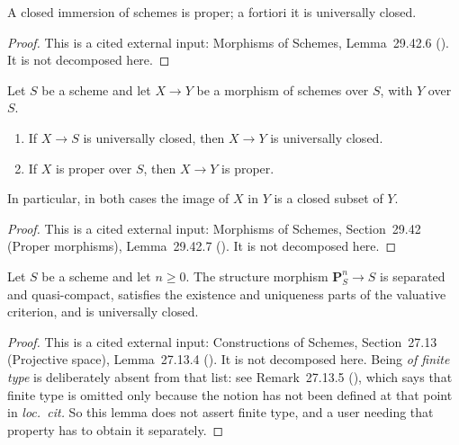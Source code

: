 \begin{lemma}
\label{lem:pc-closed-immersion-proper}
A closed immersion of schemes is proper; a fortiori it is universally
closed.
\end{lemma}
\begin{proof}
This is a cited external input: Morphisms of Schemes, Lemma~29.42.6
().  It is not decomposed here.
\end{proof}

\begin{lemma}
\label{lem:pc-proper-to-separated-target}
Let $S$ be a scheme and let $X\to Y$ be a morphism of schemes over $S$, with
$Y$  over $S$.
\begin{enumerate}
\item If $X\to S$ is universally closed, then $X\to Y$ is universally closed.
\item If $X$ is proper over $S$, then $X\to Y$ is proper.
\end{enumerate}
In particular, in both cases the image of $X$ in $Y$ is a closed subset
of $Y$.
\end{lemma}
\begin{proof}
This is a cited external input: Morphisms of Schemes, Section~29.42 (Proper
morphisms), Lemma~29.42.7 ().  It is not decomposed here.
\end{proof}

\begin{lemma}
\label{lem:pc-projective-space-separated}
Let $S$ be a scheme and let $n\ge0$.  The structure morphism
$\mathbf P^n_S\to S$ is separated and quasi-compact, satisfies the existence
and uniqueness parts of the valuative criterion, and is universally closed.
\end{lemma}
\begin{proof}
This is a cited external input: Constructions of Schemes, Section~27.13
(Projective space), Lemma~27.13.4 ().  It is not
decomposed here.  Being \emph{of finite type} is deliberately absent from that
list: see Remark~27.13.5 (), which says that finite type
is omitted only because the notion has not been defined at that point in
\emph{loc.\ cit.}  So this lemma does not assert finite type, and a user
needing that property has to obtain it separately.
\end{proof}

